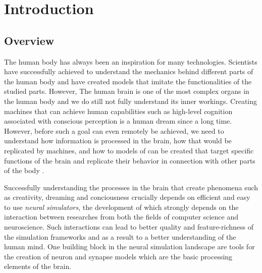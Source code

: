 \chapter{Introduction}

\section{Overview}


The human body has always been an inspiration for many technologies. Scientists have successfully achieved to understand the mechanics behind different parts of the human body and have created models that imitate the functionalities of the studied parts. However, The human brain is one of the most complex organs in the human body \citep{nolte2002human} and we do still not fully understand its inner workings. Creating machines that can achieve human capabilities such as high-level cognition associated with conscious perception is a human dream since a long time. However, before such a goal can even remotely be achieved, we need to understand how information is processed in the brain, how that would be replicated by machines, and how to models of can be created that target specific functions of the brain and replicate their behavior in connection with other parts of the body .

Successfully understanding the processes in the brain that create phenomena such as creativity, dreaming and conciousness crucially depends on efficient and easy to use \emph{neural simulators}, the development of which strongly depends on the interaction between researches from both the fields of computer science and neuroscience. Such interactions can lead to better quality and feature-richness of the simulation frameworks and as a result to a better understanding of the human mind. One building block in the neural simulation landscape are tools for the creation of neuron and synapse models which are the basic processing elements of the brain. 


